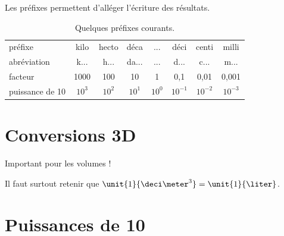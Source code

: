 Les préfixes permettent d'alléger l'écriture des résultats.

\begin{table}[h]
\center
\begin{tabular}{l|c|c|c|c|c|c|c}
préfixe         & kilo & hecto& déca & ...  & déci & centi& milli\\
abréviation     & k... & h... & da...& ...  & d... & c... & m... \\
facteur         & 1000 & 100  & 10   & 1    & 0{,}1& 0{,}01& 0{,}001 \\
puissance de 10 &$10^3$&$10^2$&$10^1$&$10^0$&$10^{-1}$&$10^{-2}$&$10^{-3}$ 

\end{tabular}
\caption{Quelques préfixes courants.}
\end{table}

\section*{Conversions 3D}

Important pour les volumes !

\begin{didascalie}
Il faut surtout retenir que $\unit{1}{\deci\meter^3}=\unit{1}{\liter}$.
\end{didascalie}



\section*{Puissances de 10}


